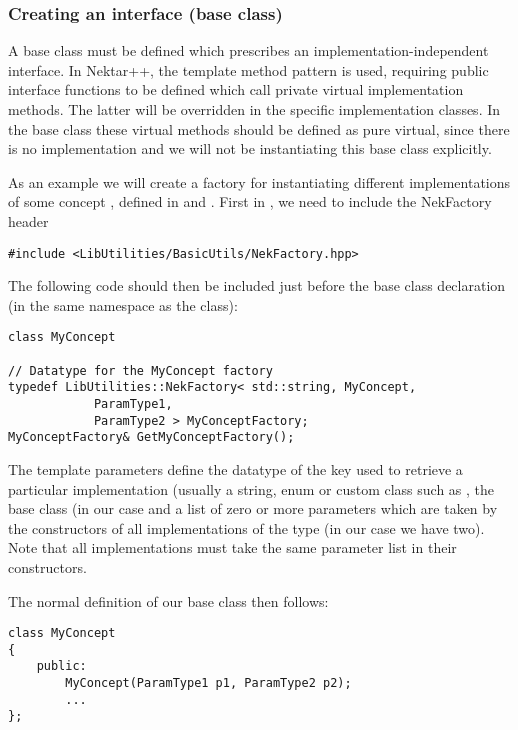 \subsubsection{Creating an interface (base class)}
A base class must be defined which prescribes an implementation-independent
interface. In Nektar++, the template method pattern is used, requiring public
interface functions to be defined which call private virtual implementation
methods. The latter will be overridden in the specific implementation classes.
In the base class these virtual methods should be defined as pure virtual, since
there is no implementation and we will not be instantiating this base class
explicitly.

As an example we will create a factory for instantiating different
implementations of some concept , defined in
 and . First in ,
we need to include the NekFactory header

\begin{lstlisting}[style=C++Style]
#include <LibUtilities/BasicUtils/NekFactory.hpp>
\end{lstlisting}

The following code should then be included just before the base class
declaration (in the same namespace as the class):

\begin{lstlisting}[style=C++Style]
class MyConcept

// Datatype for the MyConcept factory
typedef LibUtilities::NekFactory< std::string, MyConcept, 
            ParamType1,
            ParamType2 > MyConceptFactory;
MyConceptFactory& GetMyConceptFactory();
\end{lstlisting}

The template parameters define the datatype of the key used to retrieve a
particular implementation (usually a string, enum or custom class such as
, the base class (in our case  and a list
of zero or more parameters which are taken by the constructors of all
implementations of the type  (in our case we have two). Note
that all implementations must take the same parameter list in their constructors.

The normal definition of our base class then follows:

\begin{lstlisting}[style=C++Style]
class MyConcept 
{
    public:
        MyConcept(ParamType1 p1, ParamType2 p2);
        ...
};
\end{lstlisting}

